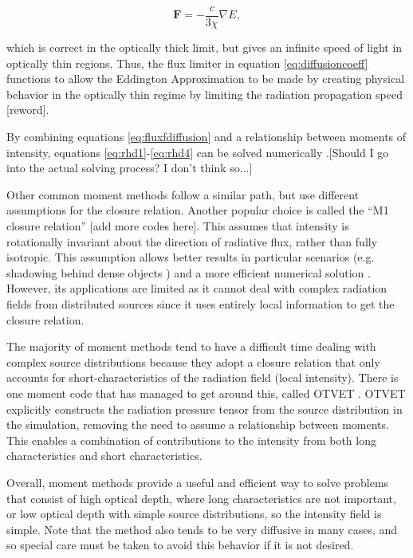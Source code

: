 \begin{equation}
\label{eq:eddingtonrhd}
\mathbf{F} = -\frac{c}{3\chi}\nabla E,
\end{equation}

which is correct in the optically thick limit, but gives an infinite speed of light in optically thin regions. Thus, the flux limiter in equation \ref{eq:diffusioncoeff} functions to allow the Eddington Approximation to be made by creating physical behavior in the optically thin regime by limiting the radiation propagation speed [reword].

By combining equations \ref{eq:fluxfdiffusion} and a relationship between moments of intensity, equations \ref{eq:rhd1}-\ref{eq:rhd4} can be solved numerically \citep{turnerStone01}.[Should I go into the actual solving process? I don't think so...]

Other common moment methods follow a similar path, but use different assumptions for the closure relation. Another popular choice is called the ``M1 closure relation'' \citep{levermore84, skinnerOstriker13}[add more codes here]. This assumes that intensity is rotationally invariant about the direction of radiative flux, rather than fully isotropic. This assumption allows better results in particular scenarios (e.g. shadowing behind dense objects \citep{skinnerOstriker13}) and a more efficient numerical solution \citep{gonzalezEt07,aubertTeyssier08}. However, its applications are limited as it cannot deal with complex radiation fields from distributed sources since it uses entirely local information to get the closure relation.

The majority of moment methods tend to have a difficult time dealing with complex source distributions because they adopt a closure relation that only accounts for short-characteristics of the radiation field (local intensity). There is one moment code that has managed to get around this, called OTVET \citep{gnedinAbel01}. OTVET explicitly constructs the radiation pressure tensor from the source distribution in the simulation, removing the need to assume a relationship between moments. This enables a combination of contributions to the intensity from both long characteristics and short characteristics.

Overall, moment methods provide a useful and efficient way to solve problems that consist of high optical depth, where long characteristics are not important, or low optical depth with simple source distributions, so the intensity field is simple. Note that the method also tends to be very diffusive in many cases, and so special care must be taken to avoid this behavior if it is not desired.

